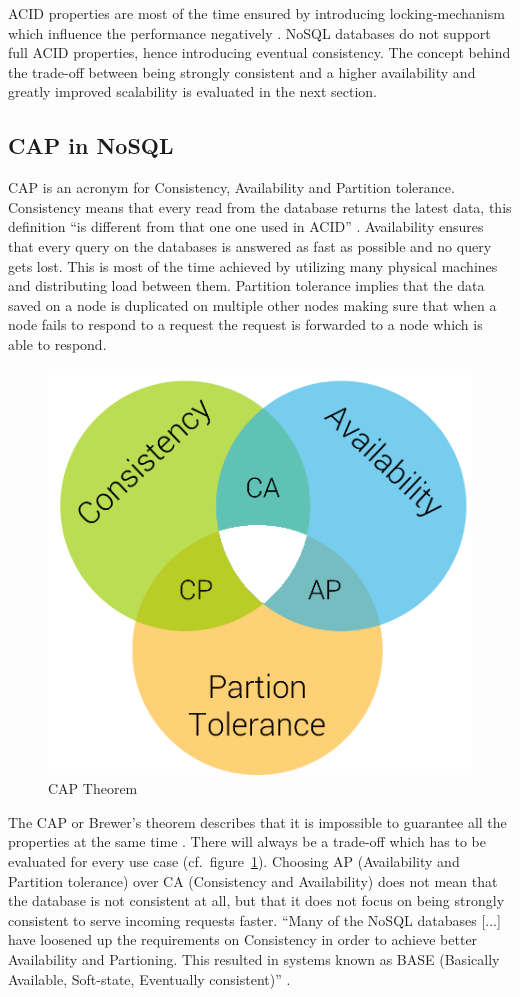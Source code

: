 ACID properties are most of the time ensured by introducing locking-mechanism which influence the performance negatively \cite[1]{hecht.2011}. NoSQL databases do not support full ACID properties, hence introducing eventual consistency. The concept behind the trade-off between being strongly consistent and a higher availability and greatly improved scalability is evaluated in the next section.


\subsection{CAP in NoSQL}
\label{subsec:cap}
CAP is an acronym for Consistency, Availability and Partition tolerance. Consistency means that every read from the database returns the latest data, this definition \enquote{is different from that one one used in ACID} \cite[72]{pokorny.2011}. Availability ensures that every query on the databases is answered as fast as possible and no query gets lost. This is most of the time achieved by utilizing many physical machines and distributing load between them. Partition tolerance implies that the data saved on a node is duplicated on multiple other nodes making sure that when a node fails to respond to a request the request is forwarded to a node which is able to respond. \cite[72]{pokorny.2011}

\begin{figure}[H]
  \centering
  \includegraphics[width=.33\textwidth]{Figures/cap.png}
  \caption[CAP Theorem]{CAP Theorem}
  \label{fig:cap-theorem}
\end{figure}

The CAP or Brewer's theorem describes that it is impossible to guarantee all the properties at the same time \cite[72]{pokorny.2011}. There will always be a trade-off which has to be evaluated for every use case (cf.~figure~\ref{fig:cap-theorem}). Choosing AP (Availability and Partition tolerance) over CA (Consistency and Availability) does not mean that the database is not consistent at all, but that it does not focus on being strongly consistent to serve incoming requests faster. \enquote{Many of the NoSQL databases [...] have loosened up the requirements on Consistency in order to achieve better Availability and Partioning. This resulted in systems known as BASE (Basically Available, Soft-state, Eventually consistent)} \cite[4]{moniruzzaman.2013}.